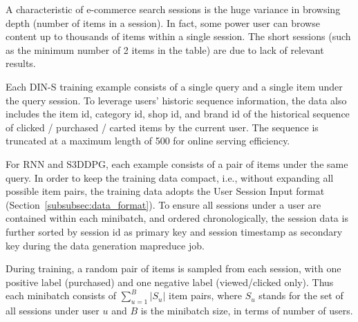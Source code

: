 A characteristic of e-commerce search sessions is the huge variance in browsing depth (number of items in a session). In fact, some power user can browse content up to thousands of items within a single session. 
The short sessions (such as the minimum number of 2 items in the table) are due to lack of relevant results. 



Each DIN-S training example consists of a single query and a single item under the query session. To leverage users' historic sequence information, the data also includes the item id, category id, shop id, and brand id of the historical sequence of clicked / purchased / carted items by the current user. The sequence is truncated at a maximum length of 500 for online serving efficiency. 

For RNN and S3DDPG, each example consists of a pair of items under the same query. In order to keep the training data compact, i.e., without expanding all possible item pairs, the training data adopts the User Session Input format (Section~\ref{subsubsec:data_format}). To ensure all sessions under a user are contained within each minibatch, and ordered chronologically, the session data is further sorted by session id as primary key and session timestamp as secondary key during the data generation mapreduce job.



During training, a random pair of items is sampled from each session, with one positive label (purchased) and one negative label (viewed/clicked only). Thus each minibatch consists of $\sum_{u=1}^B |S_u|$ item pairs, where $S_u$ stands for the set of all sessions under user $u$ and $B$ is the minibatch size, in terms of number of users. 


